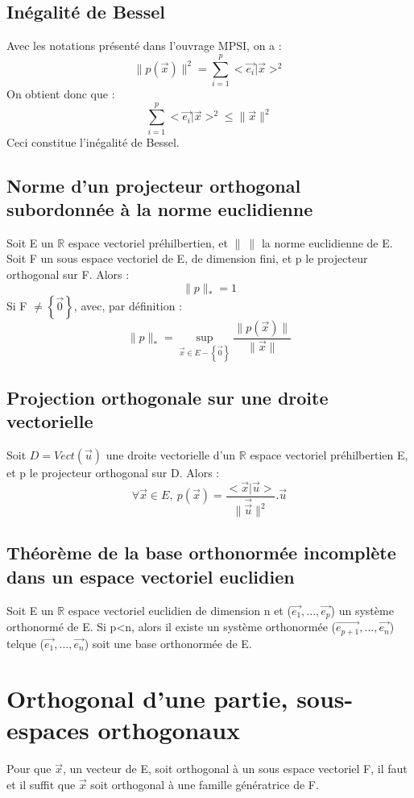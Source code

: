 \subsection{Inégalité de Bessel}
Avec les notations présenté dans l'ouvrage MPSI, on a : 
$$\parallel p(\overrightarrow{x}) \parallel^2 = \sum_{i=1}^p <\overrightarrow{e_i}|\overrightarrow{x}>^2$$
On obtient donc que : 
$$\sum_{i=1}^p <\overrightarrow{e_i}|\overrightarrow{x}>^2 \leq \parallel\overrightarrow{x}\parallel^2$$
Ceci constitue l'inégalité de Bessel.
\subsection{Norme d'un projecteur orthogonal subordonnée à la norme euclidienne}
Soit E un $\mathbb{R}$ espace vectoriel préhilbertien, et $\parallel~\parallel$ la norme euclidienne de E.\\
Soit F un sous espace vectoriel de E, de dimension fini, et p le projecteur orthogonal sur F. Alors : 
$$\parallel p \parallel_{*} = 1$$
Si F $\neq \left\lbrace \overrightarrow{0}\right\rbrace$, avec, par définition : 
$$\parallel p \parallel_* = \underset{\overrightarrow{x} \in E - \left\lbrace \overrightarrow{0}\right\rbrace}\sup \dfrac{\parallel p(\overrightarrow{x})\parallel}{\parallel\overrightarrow{x}\parallel}$$
\subsection{Projection orthogonale sur une droite vectorielle}
Soit $D=Vect(\overrightarrow{u})$ une droite vectorielle d'un $\mathbb{R}$ espace vectoriel préhilbertien E, et p le projecteur orthogonal sur D. Alors : 
$$\forall \overrightarrow{x} \in E,~ p(\overrightarrow{x}) = \dfrac{<\overrightarrow{x}|\overrightarrow{u}>}{\parallel\overrightarrow{\overrightarrow{u}}\parallel^2}.\overrightarrow{u}$$
\subsection{Théorème de la base orthonormée incomplète dans un espace vectoriel euclidien}
Soit E un $\mathbb{R}$ espace vectoriel euclidien de dimension n et ($\overrightarrow{e_1},...,\overrightarrow{e_p}$) un système orthonormé de E. Si p<n, alors il existe un système orthonormée ($\overrightarrow{e_{p+1}},...,\overrightarrow{e_n}$) telque ($\overrightarrow{e_1},...,\overrightarrow{e_n}$) soit une base orthonormée de E.
\section{Orthogonal d'une partie, sous-espaces orthogonaux}
\begin{coro}
Pour que $\overrightarrow{x}$, un vecteur de E, soit orthogonal à un sous espace vectoriel F, il faut et il suffit que $\overrightarrow{x}$ soit orthogonal à une famille génératrice de F.
\end{coro}

